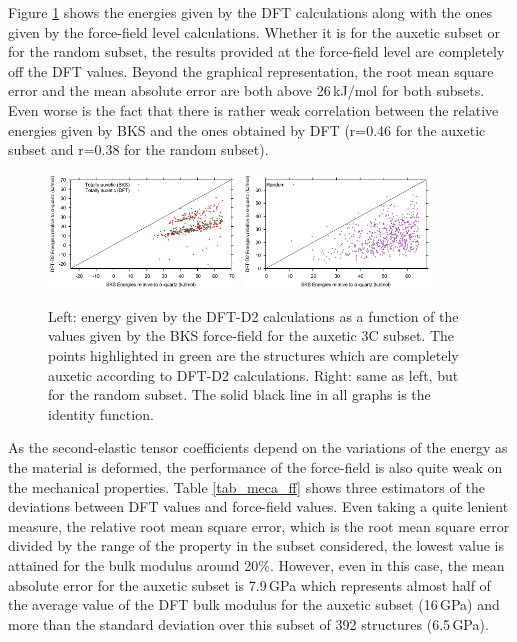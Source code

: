 \documentclass[journal=jacsat,manuscript=article]{achemso}
\begin{document}
Figure \ref{corr_En} shows the energies given by the DFT calculations along with the ones given by the force-field level calculations. Whether it is for the auxetic subset or for the random subset, the results provided at the force-field level are completely off the DFT values. Beyond the graphical representation, the root mean square error and the mean absolute error are both above 26\,kJ/mol for both subsets. Even worse is the fact that there is rather weak correlation between the relative energies given by BKS and the ones obtained by DFT (r=0.46 for the auxetic subset and r=0.38 for the random subset).
			
\begin{figure}[ht!]\centering
\includegraphics[clip,trim=0.15cm 0.05cm 0.25cm 0.1cm,width=0.45\textwidth]{zeolite_study_6_1}
\includegraphics[clip,trim=0.15cm 0.05cm 0.25cm 0.1cm,width=0.45\textwidth]{zeolite_study_6_2}
\caption{Left: energy given by the DFT-D2 calculations as a function of the values given by the BKS force-field for the auxetic 3C subset. The points highlighted in green are the structures which are completely auxetic according to DFT-D2 calculations. Right: same as left, but for the random subset. The solid black line in all graphs is the identity function.
\label{corr_En}}
\end{figure}
			
As the second-elastic tensor coefficients depend on the variations of the energy as the material is deformed, the performance of the force-field is also quite weak on the mechanical properties. Table \ref{tab_meca_ff} shows three estimators of the deviations between DFT values and force-field values. Even taking a quite lenient measure, the relative root mean square error, which is the root mean square error divided by the range of the property in the subset considered, the lowest value is attained for the bulk modulus around 20\%. However, even in this case, the mean absolute error for the auxetic subset is 7.9\,GPa which represents almost half of the average value of the DFT bulk modulus for the auxetic subset (16\,GPa) and more than the standard deviation over this subset of 392 structures (6.5\,GPa).
			
\end{document}
